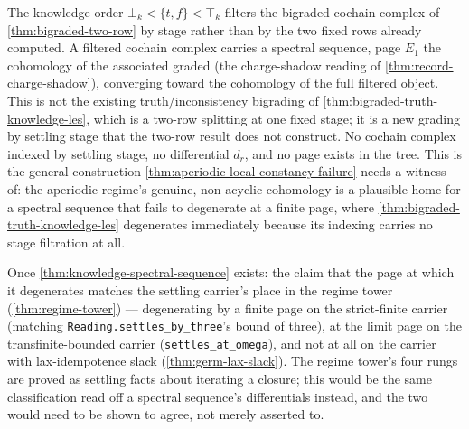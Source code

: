 \begin{theorem}\label{thm:knowledge-spectral-sequence}\notready{}
The knowledge order $\bot_k < \{t,f\} < \top_k$ filters the bigraded cochain
complex of \cref{thm:bigraded-two-row} by stage rather than by the two fixed
rows already computed. A filtered cochain complex carries a spectral
sequence, page $E_1$ the cohomology of the associated graded (the
charge-shadow reading of \cref{thm:record-charge-shadow}), converging toward
the cohomology of the full filtered object. This is not the existing
truth/inconsistency bigrading of \cref{thm:bigraded-truth-knowledge-les},
which is a two-row splitting at one fixed stage; it is a new grading by
settling stage that the two-row result does not construct. No cochain
complex indexed by settling stage, no differential $d_r$, and no page exists
in the tree. This is the general construction \cref{thm:aperiodic-local-constancy-failure}
needs a witness of: the aperiodic regime's genuine, non-acyclic cohomology
is a plausible home for a spectral sequence that fails to degenerate at a
finite page, where \cref{thm:bigraded-truth-knowledge-les} degenerates
immediately because its indexing carries no stage filtration at all.
\end{theorem}

\begin{theorem}\label{thm:degeneration-regime-invariant}\notready{}
Once \cref{thm:knowledge-spectral-sequence} exists: the claim that the page
at which it degenerates matches the settling carrier's place in the regime
tower (\cref{thm:regime-tower}) --- degenerating by a finite page on the
strict-finite carrier (matching \texttt{Reading.settles\_by\_three}'s bound of
three), at the limit page on the transfinite-bounded carrier
(\texttt{settles\_at\_omega}), and not at all on the carrier with
lax-idempotence slack (\cref{thm:germ-lax-slack}). The regime tower's four
rungs are proved as settling facts about iterating a closure; this would be
the same classification read off a spectral sequence's differentials
instead, and the two would need to be shown to agree, not merely asserted to.
\end{theorem}

